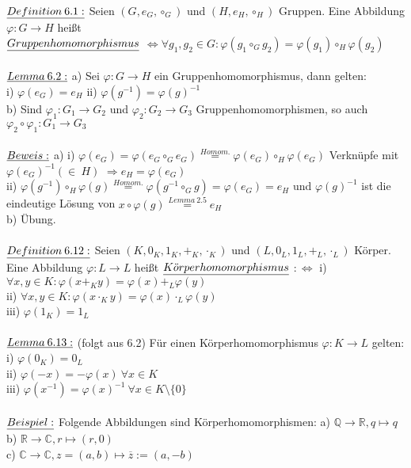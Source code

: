 \documentclass[fleqn, a4paper, 11pt]{scrartcl}
\newcommand{\RR}{\mathbb{R}}
\newcommand{\QQ}{\mathbb{Q}}
\newcommand{\CC}{\mathbb{C}}
\theoremstyle{definition}
\begin{document}
$\uline{Definition\:6.1:}$ Seien $(G,e_G,\circ_G)$ und $(H,e_H,\circ_H)$ Gruppen. Eine Abbildung $\varphi:G\rightarrow H$ heißt \\$\uline{Gruppenhomomorphismus}$ $\Leftrightarrow\forall g_1,g_2\in G:\varphi(g_1\circ_G g_2)=\varphi(g_1)\circ_H \varphi(g_2)$\\
\\
$\uline{Lemma\:6.2:}$ a) Sei $\varphi:G\rightarrow H$ ein Gruppenhomomorphismus, dann gelten:\\
i) $\varphi(e_G)=e_H$ \quad ii) $\varphi(g^{-1})=\varphi(g)^{-1}$\\
b) Sind $\varphi_1 :G_1\rightarrow G_2$ und $\varphi_2 :G_2\rightarrow G_3$ Gruppenhomomorphismen, so auch $\varphi_2\circ\varphi_1 :G_1\rightarrow G_3$\\
\\
$\uline{Beweis:}$ a) i) $\varphi(e_G)=\varphi(e_G\circ_G e_G)\stackrel{Homom.}{=}\varphi(e_G)\circ_H\varphi(e_G)$ Verknüpfe mit $\varphi(e_G)^{-1}(\in\:H)$ $\Rightarrow e_H=\varphi(e_G)$\\
ii) $\varphi(g^{-1})\circ_H\varphi(g)\stackrel{Homom.}{=} \varphi(g^{-1}\circ_G g)=\varphi(e_G)=e_H$ und $\varphi(g)^{-1}$ ist die eindeutige Lösung von $x\circ\varphi(g)\stackrel{Lemma\:2.5}{=}e_H$\\
b) \"Ubung.\\
\\
$\uline{Definition\:6.12:}$ Seien $(K,0_K,1_K,+_K,\cdot_K)$ und $(L,0_L,1_L,+_L,\cdot_L)$ Körper. Eine Abbildung $\varphi:L\rightarrow L$ heißt $\uline{K\ddot{o}rperhomomorphismus}$ $:\Leftrightarrow$ i) $\forall x,y\in K:\varphi(x+_K y)=\varphi(x)+_L\varphi(y)$\\
ii) $\forall x,y\in K:\varphi(x\cdot_K y)=\varphi(x)\cdot_L\varphi(y)$\\
iii) $\varphi(1_K)=1_L$\\
\\
$\uline{Lemma\:6.13:}$ (folgt aus 6.2) Für einen Körperhomomorphismus $\varphi:K\rightarrow L$ gelten: i) $\varphi(0_K)=0_L$\\
ii) $\varphi(-x)=-\varphi(x) \: \forall x\in K$\\
iii) $\varphi(x^{-1})=\varphi(x)^{-1}\:\forall x\in K\setminus\{0\}$\\
\\
$\uline{Beispiel:}$ Folgende Abbildungen sind Körperhomomorphismen: a) $\QQ\rightarrow\RR, q\mapsto q$\\
b) $\RR\rightarrow\CC, r\mapsto (r,0)$\\
c) $\CC\rightarrow\CC, z=(a,b)\mapsto\overline{z}:=(a,-b)$\\
\end{document}

